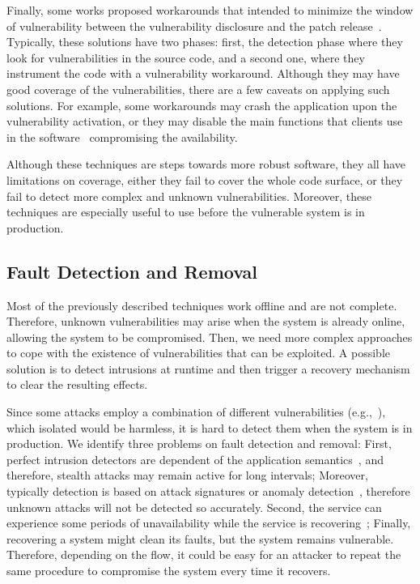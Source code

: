 Finally, some works proposed workarounds that intended to minimize the window of vulnerability between the vulnerability disclosure and the patch release~\cite{Goues:2012,Huang:2016}.
Typically, these solutions have two phases: first, the detection phase where they look for vulnerabilities in the source code, and a second one, where they instrument the code with a vulnerability workaround.
Although they may have good coverage of the vulnerabilities, there are a few caveats on applying such solutions.
For example, some workarounds may crash the application upon the vulnerability activation, or they may disable the main functions that clients use in the software~\cite{Huang:2016} compromising the availability. 


Although these techniques are steps towards more robust software, they all have limitations on coverage, either they fail to cover the whole code surface, or they fail to detect more complex and unknown vulnerabilities.
Moreover, these techniques are especially useful to use before the vulnerable system is in production.


\subsection{Fault Detection and Removal}
Most of the previously described techniques work offline and are not complete. 
Therefore, unknown vulnerabilities may arise when the system is already online, allowing the system to be compromised.
Then, we need more complex approaches to cope with the existence of vulnerabilities that can be exploited.
A possible solution is to detect intrusions at runtime and then trigger a recovery mechanism to clear the resulting effects. 

Since some attacks employ a combination of different vulnerabilities (e.g.,~\cite{stuxnet:2010}), which isolated would be harmless, it is hard to detect them when the system is in production.
We identify three problems on fault detection and removal: 
First, perfect intrusion detectors are dependent of the application semantics~\cite{Doudou:1999}, and therefore, stealth attacks may remain active for long intervals; 
Moreover, typically detection is based on attack signatures or anomaly detection~\cite{Sommer:2010}, therefore unknown attacks will not be detected so accurately.
Second, the service can experience some periods of unavailability while the service is recovering~\cite{Wilfredo:2000}; 
Finally, recovering a system might clean its faults, but the system remains vulnerable.
Therefore, depending on the flow, it could be easy for an attacker to repeat the same procedure to compromise the system every time it recovers.


